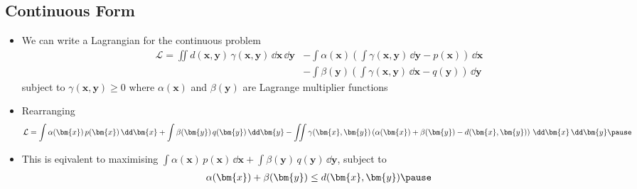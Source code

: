 \begin{slide}
  \section{Continuous Form}


\begin{PauseHighLight}
  \begin{itemize}\footnotesize
  \item We can write a Lagrangian for the continuous problem
    \begin{align*}
      \mathcal{L} = \iint d(\bm{x},\bm{y})\, \gamma(\bm{x},\bm{y})
      \, \dd \bm{x}\,\dd \bm{y}
      &- \int \alpha(\bm{x}) \left( \int \gamma(\bm{x},\bm{y})\,\dd \bm{y}
        - p(\bm{x})\right) \, \dd \bm{x}\\
      &- \int \beta(\bm{y}) \left( \int \gamma(\bm{x},\bm{y}) \, \dd
        \bm{x} -q(\bm{y})\right) \, \dd \bm{y}
    \end{align*}
    subject to $\gamma(\bm{x},\bm{y})\geq 0$\pause{} where
    $\alpha(\bm{x})$ and $\beta(\bm{y})$ are Lagrange multiplier
    functions\pauseb
  \item Rearranging
    \begin{align*}
      \mathcal{L} = \int \alpha(\bm{x})\,p(\bm{x})\, \dd \bm{x}
      + \int \beta(\bm{y})\,q(\bm{y})\,\dd \bm{y}
      -\iint \gamma(\bm{x},\bm{y})\left( \alpha(\bm{x}) + \beta(\bm{y}) -
      d(\bm{x},\bm{y})\right)\, \dd \bm{x}\,\dd \bm{y}\pause
    \end{align*}
  \item This is eqivalent to maximising
    $\int \alpha(\bm{x})\,p(\bm{x})\, \dd \bm{x} + \int
    \beta(\bm{y})\,q(\bm{y})\,\dd \bm{y}$, subject to
    \begin{align*}
      \alpha(\bm{x}) + \beta(\bm{y}) \leq d(\bm{x},\bm{y})\pause
    \end{align*}
  \end{itemize}
\end{PauseHighLight}

\end{slide}


